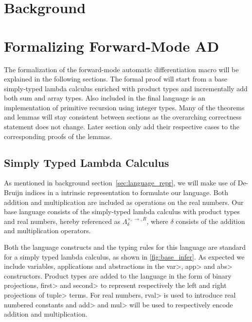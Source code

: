 \documentclass[11pt, final]{article}
\begin{document}

\newpage


\newpage

\setcounter{page}{3}
\tableofcontents
\newpage



\section{Background}






\section{Formalizing Forward-Mode AD}
  The formalization of the forward-mode automatic differentiation macro will be explained in the following sections.
  The formal proof will start from a base simply-typed lambda calculus enriched with product types and incrementally add both sum and array types.
  Also included in the final language is an implementation of primitive recursion using integer types.
  Many of the theorems and lemmas will stay consistent between sections as the overarching correctness statement does not change.
  Later section only add their respective cases to the corresponding proofs of the lemmas.

  \subsection{Simply Typed Lambda Calculus}\label{sec:formal_stlc}
  As mentioned in background section~\ref{sec:language_repr}, we will make use of De-Bruijn indices in a intrinsic representation to formulate our language.
  Both addition and multiplication are included as operations on the real numbers.
  Our base language consists of the simply-typed lambda calculus with product types and real numbers, hereby referenced as $\Lambda_{\delta}^{\times, \rightarrow, R}$, where $\delta$ consists of the addition and multiplication operators.

  Both the language constructs and the typing rules for this language are standard for a simply typed lambda calculus, as shown in \ref{fig:base_infer}.
  As expected we include variables, applications and abstractions in the \<var>, \<app> and \<abs> constructors.
  Product types are added to the language in the form of binary projections, \<first> and \<second> to represent respectively the left and right projections of \<tuple> terms.
  For real numbers, \<rval> is used to introduce real numbered constants and \<add> and \<mul> will be used to respectively encode addition and multiplication.
\end{document}
